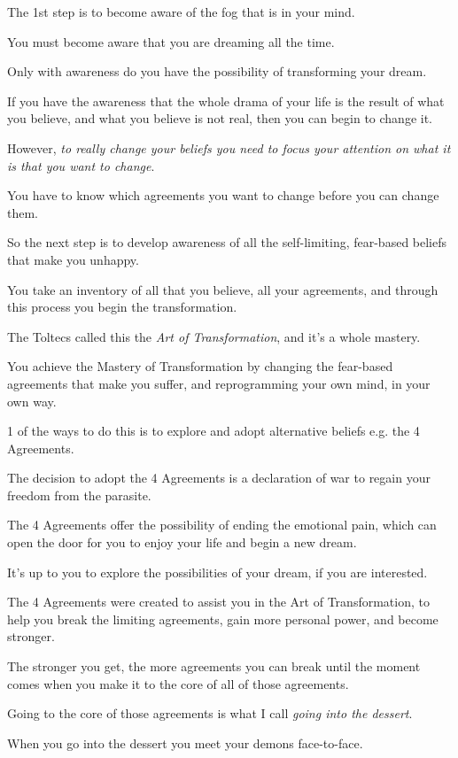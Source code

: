 \documentclass{article}
\numberwithin{equation}{section}
\begin{document}
%
The 1st step is to become aware of the fog that is in your mind.

You must become aware that you are dreaming all the time.

Only with awareness do you have the possibility of transforming your dream.

If you have the awareness that the whole drama of your life is the result of what you believe, and what you believe is not real, then you can begin to change it.

However, \textit{to really change your beliefs you need to focus your attention on what it is that you want to change}.

You have to know which agreements you want to change before you can change them.

%
So the next step is to develop awareness of all the self-limiting, fear-based beliefs that make you unhappy.

You take an inventory of all that you believe, all your agreements, and through this process you begin the transformation.

The Toltecs called this the \textit{Art of Transformation}, and it's a whole mastery.

You achieve the Mastery of Transformation by changing the fear-based agreements that make you suffer, and reprogramming your own mind, in your own way.

1 of the ways to do this is to explore and adopt alternative beliefs e.g. the 4 Agreements.

%
The decision to adopt the 4 Agreements is a declaration of war to regain your freedom from the parasite.

The 4 Agreements offer the possibility of ending the emotional pain, which can open the door for you to enjoy your life and begin a new dream.

It's up to you to explore the possibilities of your dream, if you are interested.

The 4 Agreements were created to assist you in the Art of Transformation, to help you break the limiting agreements, gain more personal power, and become stronger.

The stronger you get, the more agreements you can break until the moment comes when you make it to the core of all of those agreements.

%
Going to the core of those agreements is what I call \textit{going into the dessert}.

When you go into the dessert you meet your demons face-to-face.
\end{document}
